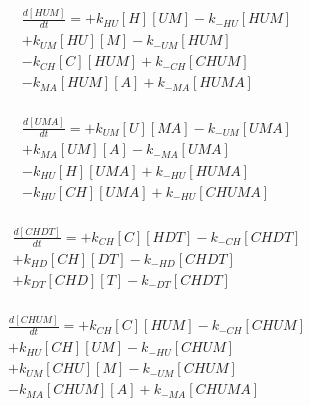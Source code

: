 \begin{equation}
\begin{split}
\frac{d[HUM]}{dt} =   + k_{HU}[H][UM]  - k_{-HU}[HUM]     \\%
                      + k_{UM}[HU][M]  - k_{-UM}[HUM]     \\%
                      - k_{CH}[C][HUM] + k_{-CH}[CHUM]    \\%
                      - k_{MA}[HUM][A] + k_{-MA}[HUMA]    \\%
\end{split}
\end{equation}

\begin{equation}
\begin{split}
\frac{d[UMA]}{dt} =   + k_{UM}[U][MA]   - k_{-UM}[UMA]    \\%
                      + k_{MA}[UM][A]   - k_{-MA}[UMA]    \\%
                      - k_{HU}[H][UMA]  + k_{-HU}[HUMA]   \\%
                      - k_{HU}[CH][UMA] + k_{-HU}[CHUMA]  \\%
\end{split}
\end{equation}

\begin{equation}
\begin{split}
\frac{d[CHDT]}{dt} =  + k_{CH}[C][HDT] - k_{-CH}[CHDT]    \\%
                      + k_{HD}[CH][DT] - k_{-HD}[CHDT]    \\%
                      + k_{DT}[CHD][T] - k_{-DT}[CHDT]    \\%
\end{split}
\end{equation}

\begin{equation}
\begin{split}
\frac{d[CHUM]}{dt} =  + k_{CH}[C][HUM]  - k_{-CH}[CHUM]   \\%
                      + k_{HU}[CH][UM]  - k_{-HU}[CHUM]   \\%
                      + k_{UM}[CHU][M]  - k_{-UM}[CHUM]   \\%
                      - k_{MA}[CHUM][A] + k_{-MA}[CHUMA]  \\%
\end{split}
\end{equation}

